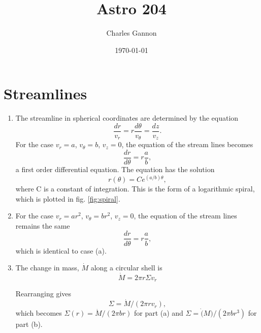 \documentclass[11pt]{article}
\author{Charles Gannon}
\date{\today}
\title{Astro 204}
\begin{document}
\maketitle
\tableofcontents

\section{Streamlines}
\label{sec:org7364290}



\begin{enumerate}[label=\alph*)]

   \item
       The streamline in spherical coordinates are determined by the equation
       \begin{equation}
          \frac{dr}{v_{r}} = r \frac{d \theta}{v_{\theta}} = \frac{dz}{v_z}.
       \end{equation}
       For the case $v_r = a$, $v_{\theta} = b$, $v_{z} = 0$, the equation of the stream lines becomes
       \begin{equation}
          \frac{d r}{d \theta} = r \frac{a}{b},
       \end{equation}
       a first order differential equation.
       The equation has the solution
       \begin{equation}
          r(\theta) = C e^{(a / b) \theta},
       \end{equation}
       where C is a constant of integration.
       This is the form of a logarithmic spiral, which is plotted in fig. \ref{fig:spiral}.
   \item
      For the case $v_r = ar^{2}$, $v_{\theta} = br^{2}$, $v_{z} = 0$, the equation of the stream lines remains the same
      \begin{equation}
         \frac{d r}{d \theta} = r \frac{a}{b},
      \end{equation}
      which is identical to case (a).

   \item
      The change in mass, $\dot{M}$ along a circular shell is
      \begin{equation}
         \dot{M} = 2 \pi r \Sigma v_{r}
      \end{equation}

      Rearranging gives
      \begin{equation}
         \Sigma = \dot{M} / (2 \pi r v_{r}),
      \end{equation}
      which becomes $\Sigma(r) = \dot{M} / (2 \pi b r)$ for part (a) and $\Sigma = \dot(M) / (2 \pi b r^{3})$ for part (b).
\end{enumerate}
\end{document}
